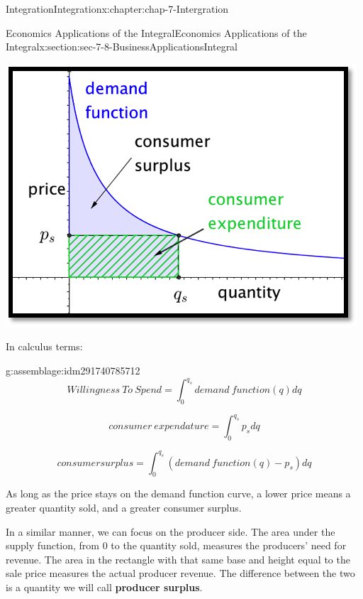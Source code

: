 \documentclass[oneside,10pt,]{book}
\newcommand{\terminology}[1]{\textbf{#1}}
\numberwithin{equation}{section}
\begin{document}
\begin{chapterptx}{Integration}{}{Integration}{}{}{x:chapter:chap-7-Intergration}
\begin{sectionptx}{Economics Applications of the Integral}{}{Economics Applications of the Integral}{}{}{x:section:sec-7-8-BusinessApplicationsIntegral}
\begin{sidebyside}{1}{0.25}{0.25}{0}%
\begin{sbspanel}{0.5}%
\includegraphics[width=\linewidth]{images/sec7-8-2.png}
\end{sbspanel}%
\end{sidebyside}%
\par
In calculus terms:%
\begin{assemblage}{}{g:assemblage:idm291740785712}%
%
\begin{equation*}
Willingness\ To\ Spend= \int_0^{q_s} demand\ function(q) dq
\end{equation*}
%
\par
%
\begin{equation*}
consumer\ expendature= \int_0^{q_s} p_s  dq
\end{equation*}
%
\par
%
\begin{equation*}
consumer surplus= \int_0^{q_s} (demand\ function(q)- p_s )  dq
\end{equation*}
%
\end{assemblage}
As long as the price stays on the demand function curve, a lower price means a greater quantity sold, and a greater consumer surplus.%
\par
In a similar manner, we can focus on the producer side. The area under the supply function, from 0 to the quantity sold, measures the producers’ need for revenue.  The area in the rectangle with that same base and height equal to the sale price measures the actual producer revenue.  The difference between the two is a quantity we will call \terminology{producer surplus}.%

\end{sectionptx}
\end{chapterptx}
\end{document}
